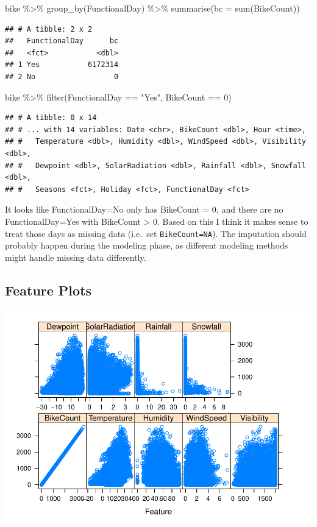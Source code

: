 \documentclass[
]{article}
\newenvironment{Shaded}{\begin{snugshade}}{\end{snugshade}}
\newcommand{\AttributeTok}[1]{\textcolor[rgb]{0.77,0.63,0.00}{#1}}
\newcommand{\DecValTok}[1]{\textcolor[rgb]{0.00,0.00,0.81}{#1}}
\newcommand{\FunctionTok}[1]{\textcolor[rgb]{0.00,0.00,0.00}{#1}}
\newcommand{\NormalTok}[1]{#1}
\newcommand{\SpecialCharTok}[1]{\textcolor[rgb]{0.00,0.00,0.00}{#1}}
\newcommand{\StringTok}[1]{\textcolor[rgb]{0.31,0.60,0.02}{#1}}
\begin{document}
\begin{Shaded}
\begin{Highlighting}[]
\NormalTok{bike }\SpecialCharTok{\%\textgreater{}\%} \FunctionTok{group\_by}\NormalTok{(FunctionalDay) }\SpecialCharTok{\%\textgreater{}\%} \FunctionTok{summarise}\NormalTok{(}\AttributeTok{bc =} \FunctionTok{sum}\NormalTok{(BikeCount))}
\end{Highlighting}
\end{Shaded}

\begin{verbatim}
## # A tibble: 2 x 2
##   FunctionalDay      bc
##   <fct>           <dbl>
## 1 Yes           6172314
## 2 No                  0
\end{verbatim}

\begin{Shaded}
\begin{Highlighting}[]
\NormalTok{bike }\SpecialCharTok{\%\textgreater{}\%} \FunctionTok{filter}\NormalTok{(FunctionalDay }\SpecialCharTok{==} \StringTok{"Yes"}\NormalTok{, BikeCount }\SpecialCharTok{==} \DecValTok{0}\NormalTok{)}
\end{Highlighting}
\end{Shaded}

\begin{verbatim}
## # A tibble: 0 x 14
## # ... with 14 variables: Date <chr>, BikeCount <dbl>, Hour <time>,
## #   Temperature <dbl>, Humidity <dbl>, WindSpeed <dbl>, Visibility <dbl>,
## #   Dewpoint <dbl>, SolarRadiation <dbl>, Rainfall <dbl>, Snowfall <dbl>,
## #   Seasons <fct>, Holiday <fct>, FunctionalDay <fct>
\end{verbatim}

It looks like FunctionalDay=No only has BikeCount = 0, and there are no
FunctionalDay=Yes with BikeCount \textgreater{} 0. Based on this I think
it makes sense to treat those days as missing data (i.e.~set
\texttt{BikeCount=NA}). The imputation should probably happen during the
modeling phase, as different modeling methods might handle missing data
differently.

\hypertarget{feature-plots}{%
\subsection{Feature Plots}\label{feature-plots}}

\includegraphics{BikeProject_files/figure-latex/feature-plots-1.pdf}
\end{document}
